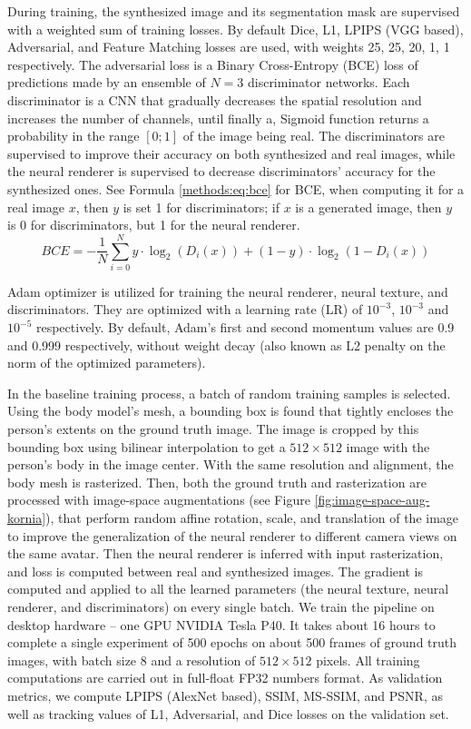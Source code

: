 During training, the synthesized image and its segmentation mask are supervised with a weighted sum of training losses. By default Dice, L1, LPIPS (VGG \cite{dnn:vgg14} based), Adversarial, and Feature Matching losses are used, with weights 25, 25, 20, 1, 1 respectively. The adversarial loss is a Binary Cross-Entropy (BCE) loss of predictions made by an ensemble of $N=3$ discriminator networks. Each discriminator is a CNN that gradually decreases the spatial resolution and increases the number of channels, until finally a, Sigmoid function returns a probability in the range $[0;1]$ of the image being real. The discriminators are supervised to improve their accuracy on both synthesized and real images, while the neural renderer is supervised to decrease discriminators' accuracy for the synthesized ones. See Formula \ref{methods:eq:bce} for BCE, when computing it for a real image $x$, then $y$ is set 1 for discriminators; if $x$ is a generated image, then $y$ is 0 for discriminators, but 1 for the neural renderer.
\begin{equation}
	BCE = - \dfrac{1}{N} \sum_{i=0}^N y \cdot \log_{2}(D_i(x)) + (1-y) \cdot \log_{2}(1 - D_i(x)) 
	\label{methods:eq:bce}
\end{equation}

Adam \cite{dnn:adam14} optimizer is utilized for training the neural renderer, neural texture, and discriminators. They are optimized with a learning rate (LR) of $10^{-3}$, $10^{-3}$ and $10^{-5}$ respectively. By default, Adam's first and second momentum values are 0.9 and 0.999 respectively, without weight decay (also known as L2 penalty on the norm of the optimized parameters).

In the baseline training process, a batch of random training samples is selected. Using the body model's mesh, a bounding box is found that tightly encloses the person's extents on the ground truth image. The image is cropped by this bounding box using bilinear interpolation to get a $512 \times 512$ image with the person's body in the image center. With the same resolution and alignment, the body mesh is rasterized. Then, both the ground truth and rasterization are processed with image-space augmentations (see Figure \ref{fig:image-space-aug-kornia}), that perform random affine rotation, scale, and translation of the image to improve the generalization of the neural renderer to different camera views on the same avatar. Then the neural renderer is inferred with input rasterization, and loss is computed between real and synthesized images. The gradient is computed and applied to all the learned parameters (the neural texture, neural renderer, and discriminators) on every single batch. We train the pipeline on desktop hardware -- one GPU NVIDIA Tesla P40. It takes about 16 hours to complete a single experiment of 500 epochs on about 500 frames of ground truth images, with batch size 8 and a resolution of $512\times512$ pixels. All training computations are carried out in full-float FP32 numbers format. As validation metrics, we compute LPIPS (AlexNet \cite{dnn:alexnet12} based), SSIM, MS-SSIM, and PSNR, as well as tracking values of L1, Adversarial, and Dice losses on the validation set.

